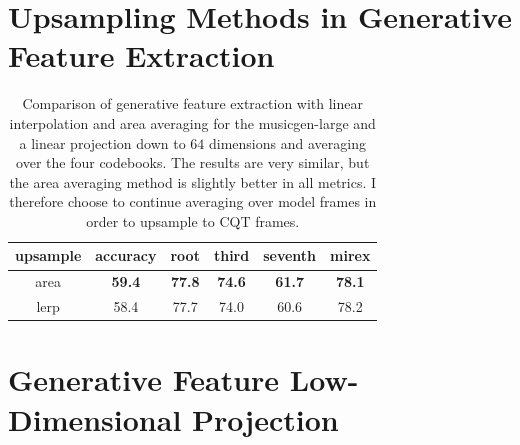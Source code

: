 \section{Upsampling Methods in Generative Feature Extraction}\label{app:linear_interpolation_vs_area_averaging}

\begin{table}[H]
    \centering
    \begin{tabular}{cccccc}
        \toprule
        upsample & accuracy & root & third & seventh & mirex  \\  
        \midrule
        area & \textbf{59.4} & \textbf{77.8} & \textbf{74.6} & \textbf{61.7} & \textbf{78.1} \\
        lerp & 58.4 & 77.7 & 74.0 & 60.6 & 78.2 \\
        \bottomrule
    \end{tabular}
    \caption{Comparison of generative feature extraction with linear interpolation and area averaging for the musicgen-large and a linear projection down to $64$ dimensions and averaging over the four codebooks. The results are very similar, but the area averaging method is slightly better in all metrics. I therefore choose to continue averaging over model frames in order to upsample to CQT frames.}\label{tab:linear_interpolation_vs_area_averaging}
\end{table}

\section{Generative Feature Low-Dimensional Projection}\label{app:projection_dimensionality}

